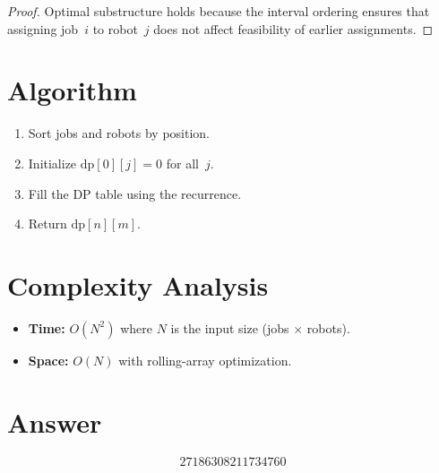 \documentclass[11pt]{article}
\begin{document}
\begin{proof}
Optimal substructure holds because the interval ordering ensures that assigning job~$i$ to robot~$j$ does not affect feasibility of earlier assignments.
\end{proof}

\section{Algorithm}

\begin{enumerate}
\item Sort jobs and robots by position.
\item Initialize $\mathrm{dp}[0][j] = 0$ for all~$j$.
\item Fill the DP table using the recurrence.
\item Return $\mathrm{dp}[n][m]$.
\end{enumerate}

\section{Complexity Analysis}

\begin{itemize}
\item \textbf{Time:} $O(N^2)$ where $N$ is the input size (jobs $\times$ robots).
\item \textbf{Space:} $O(N)$ with rolling-array optimization.
\end{itemize}

\section{Answer}

\[
\boxed{27186308211734760}
\]
\end{document}
